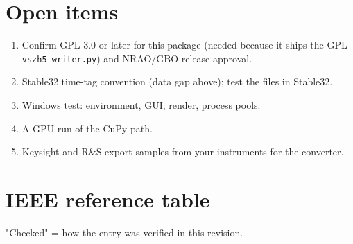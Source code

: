\documentclass[10pt,a4paper]{article}
\providecommand{\tightlist}{\setlength{\itemsep}{0pt}\setlength{\parskip}{0pt}}
\begin{document}

\hypertarget{open-items}{%
\section{Open items}\label{open-items}}

\begin{enumerate}
\def\labelenumi{\arabic{enumi}.}
\tightlist
\item
  Confirm GPL-3.0-or-later for this package (needed because it ships the
  GPL \texttt{vszh5\_\allowbreak{}writer.py}) and NRAO/GBO release approval.
\item
  Stable32 time-tag convention (data gap above); test the files in Stable32.
\item
  Windows test: environment, GUI, render, process pools.
\item
  A GPU run of the CuPy path.
\item
  Keysight and R\&S export samples from your instruments for the converter.
\end{enumerate}


\hypertarget{ieee-reference-table}{%
\section{IEEE reference table}\label{ieee-reference-table}}

"Checked" = how the entry was verified in this revision.
\end{document}
